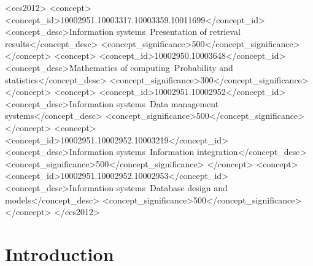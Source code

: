 \documentclass[11pt,sigconf]{acmart}
\begin{document}
%
%
\begin{CCSXML}
<ccs2012>
   <concept>
       <concept_id>10002951.10003317.10003359.10011699</concept_id>
       <concept_desc>Information systems~Presentation of retrieval results</concept_desc>
       <concept_significance>500</concept_significance>
       </concept>
   <concept>
       <concept_id>10002950.10003648</concept_id>
       <concept_desc>Mathematics of computing~Probability and statistics</concept_desc>
       <concept_significance>300</concept_significance>
       </concept>
   <concept>
       <concept_id>10002951.10002952</concept_id>
       <concept_desc>Information systems~Data management systems</concept_desc>
       <concept_significance>500</concept_significance>
       </concept>
   <concept>
       <concept_id>10002951.10002952.10003219</concept_id>
       <concept_desc>Information systems~Information integration</concept_desc>
       <concept_significance>500</concept_significance>
       </concept>
   <concept>
       <concept_id>10002951.10002952.10002953</concept_id>
       <concept_desc>Information systems~Database design and models</concept_desc>
       <concept_significance>500</concept_significance>
       </concept>
 </ccs2012>
\end{CCSXML}





\maketitle


\section{Introduction}
\end{document}
